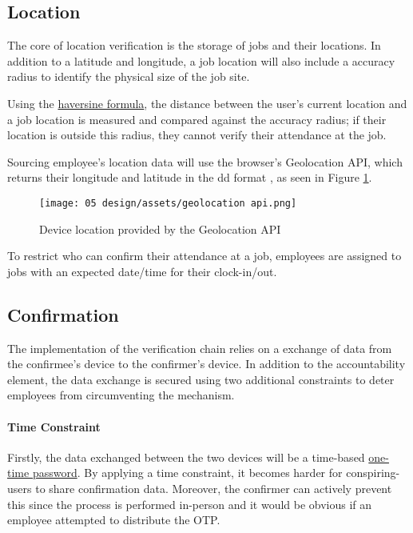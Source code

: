\subsection{Location} 

The core of location verification is the storage of jobs
and their locations.
In addition to a latitude and longitude, a job location
will also include a accuracy radius to identify the
physical size of the job site.

Using the \hyperref[ss:coordSystems]{haversine formula},
the distance between the user's current location and a job
location is measured and compared against the accuracy
radius; if their location is outside this radius, they
cannot verify their attendance at the job.

Sourcing employee's location data will use the browser's
Geolocation API, which returns their longitude and latitude
in the \gls{dd} format \parencite{geolocationApi}, as seen
in Figure \ref{fig:geolocationApi}.

\begin{figure}[h]
  \centering
  \texttt{[image: 05
    design/assets/geolocation api.png]}
  \caption{Device location provided by the Geolocation API}
  \label{fig:geolocationApi}
  \parencite{geolocationApi}
\end{figure}

To restrict who can confirm their attendance at a job,
employees are assigned to jobs with an expected date/time
for their clock-in/out.

\subsection{Confirmation}

The implementation of the verification chain relies on a
exchange of data from the \gls{confirmee}'s device to the
\gls{confirmer}'s device.
In addition to the accountability element, the data
exchange is secured using two additional constraints to
deter employees from circumventing the mechanism.

\paragraph{Time Constraint}

Firstly, the data exchanged between the two devices will be
a time-based \hyperref[ss:otp]{one-time password}.
By applying a time constraint, it becomes harder for
\gls{conspiring-users} to share confirmation data.
Moreover, the confirmer can actively prevent this since the
process is performed in-person and it would be obvious if
an employee attempted to distribute the OTP.

